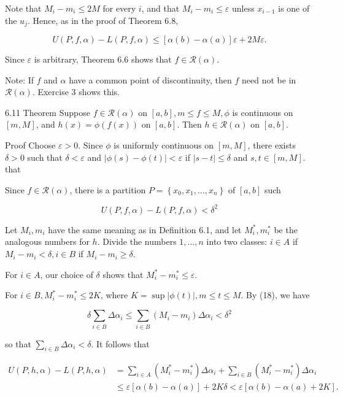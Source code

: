 \documentclass[10pt]{article}
\begin{document}
Note that $M_{i}-m_{i} \leq 2 M$ for every $i$, and that $M_{i}-m_{i} \leq \varepsilon$ unless $x_{i-1}$ is one of the $u_{j}$. Hence, as in the proof of Theorem 6.8,

$$
U(P, f, \alpha)-L(P, f, \alpha) \leq[\alpha(b)-\alpha(a)] \varepsilon+2 M \varepsilon .
$$

Since $\varepsilon$ is arbitrary, Theorem 6.6 shows that $f \in \mathscr{R}(\alpha)$.

Note: If $f$ and $\alpha$ have a common point of discontinuity, then $f$ need not be in $\mathscr{R}(\alpha)$. Exercise 3 shows this.

6.11 Theorem Suppose $f \in \mathscr{R}(\alpha)$ on $[a, b], m \leq f \leq M, \phi$ is continuous on $[m, M]$, and $h(x)=\phi(f(x))$ on $[a, b]$. Then $h \in \mathscr{R}(\alpha)$ on $[a, b]$.

Proof Choose $\varepsilon>0$. Since $\phi$ is uniformly continuous on $[m, M]$, there exists $\delta>0$ such that $\delta<\varepsilon$ and $|\phi(s)-\phi(t)|<\varepsilon$ if $|s-t| \leq \delta$ and $s, t \in[m, M]$. that

Since $f \in \mathscr{R}(\alpha)$, there is a partition $P=\left\{x_{0}, x_{1}, \ldots, x_{n}\right\}$ of $[a, b]$ such

$$
U(P, f, \alpha)-L(P, f, \alpha)<\delta^{2}
$$

Let $M_{i}, m_{i}$ have the same meaning as in Definition 6.1, and let $M_{i}^{*}, m_{i}^{*}$ be the analogous numbers for $h$. Divide the numbers $1, \ldots, n$ into two classes: $i \in A$ if $M_{i}-m_{i}<\delta, i \in B$ if $M_{i}-m_{i} \geq \delta$.

For $i \in A$, our choice of $\delta$ shows that $M_{i}^{*}-m_{i}^{*} \leq \varepsilon$.

For $i \in B, M_{i}^{*}-m_{i}^{*} \leq 2 K$, where $K=\sup |\phi(t)|, m \leq t \leq M$. By (18), we have

$$
\delta \sum_{i \in B} \Delta \alpha_{i} \leq \sum_{i \in B}\left(M_{i}-m_{i}\right) \Delta \alpha_{i}<\delta^{2}
$$

so that $\sum_{i \in B} \Delta \alpha_{i}<\delta$. It follows that

$$
\begin{aligned}
U(P, h, \alpha)-L(P, h, \alpha) & =\sum_{i \in A}\left(M_{i}^{*}-m_{i}^{*}\right) \Delta \alpha_{i}+\sum_{i \in B}\left(M_{i}^{*}-m_{i}^{*}\right) \Delta \alpha_{i} \\
& \leq \varepsilon[\alpha(b)-\alpha(a)]+2 K \delta<\varepsilon[\alpha(b)-\alpha(a)+2 K] .
\end{aligned}
$$
\end{document}
